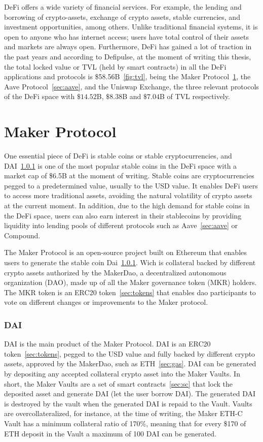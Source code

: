 \documentclass[11pt,a4paper]{report}
\begin{document}
DeFi offers a wide variety of financial services. For example, the lending and borrowing of crypto-assets, exchange of crypto assets, stable currencies, and investment opportunities, among others. Unlike traditional financial systems, it is open to anyone who has internet access; users have total control of their assets and markets are always open. Furthermore, DeFi has gained a lot of traction in the past years and according to Defipulse\cite{defipulse}, at the moment of writing this thesis, the total locked value or TVL (held by smart contracts) in all the DeFi applications and protocols is \$58.56B~\ref{fig:tvl}, being the Maker Protocol~\ref{sec:maker}, the Aave Protocol~\ref{sec:aave}, and the Uniswap Exchange\cite{uniswap}, the three relevant protocols of the DeFi space with $\$14.52$B, $\$8.38$B and $\$7.04$B of TVL respectively. 
\section{Maker Protocol}\label{sec:maker}
One essential piece of DeFi is stable coins or stable cryptocurrencies, and DAI~\ref{sec:dai} is one of the most popular stable coins in the DeFi space with a market cap of \$6.5B\cite{stablecoinsmarket} at the moment of writing. Stable coins are cryptocurrencies pegged to a predetermined value, usually to the USD value. It enables DeFi users to access more traditional assets, avoiding the natural volatility of crypto assets at the current moment. In addition, due to the high demand for stable coins in the DeFi space, users can also earn interest in their stablecoins by providing liquidity into lending pools of different protocols such as Aave~\ref{sec:aave} or Compound\cite{compound}.

The Maker Protocol\cite{maker} is an open-source project built on Ethereum that enables users to generate the stable coin Dai~\ref{sec:dai}. Wich is collateral backed by different crypto assets authorized by the MakerDao, a decentralized autonomous organization (DAO)\cite{wiki:Dao}, made up of all the Maker governance token (MKR) holders. The MKR token is an ERC20 token~\ref{sec:tokens} that enables dao participants to vote on different changes or improvements to the Maker protocol.
\subsubsection{DAI}\label{sec:dai}
DAI\cite{makerDAI} is the main product of the Maker Protocol. DAI is an ERC20 token~\ref{sec:tokens},  pegged to the USD value and fully backed by different crypto assets, approved by the MakerDao, such as ETH~\ref{sec:gas}. DAI can be generated by depositing any accepted collateral crypto asset into the Maker Vaults. In short, the Maker Vaults are a set of smart contracts~\ref{sec:sc} that lock the deposited asset and generate DAI (let the user borrow DAI). The generated DAI is destroyed by the vault when the generated DAI is repaid to the Vault. Vaults are overcollateralized, for instance, at the time of writing, the Maker ETH-C Vault has a minimum collateral ratio of 170\%\cite{oasisapp}, meaning that for every \$170 of ETH deposit in the Vault a maximum of 100 DAI can be generated.
\end{document}
